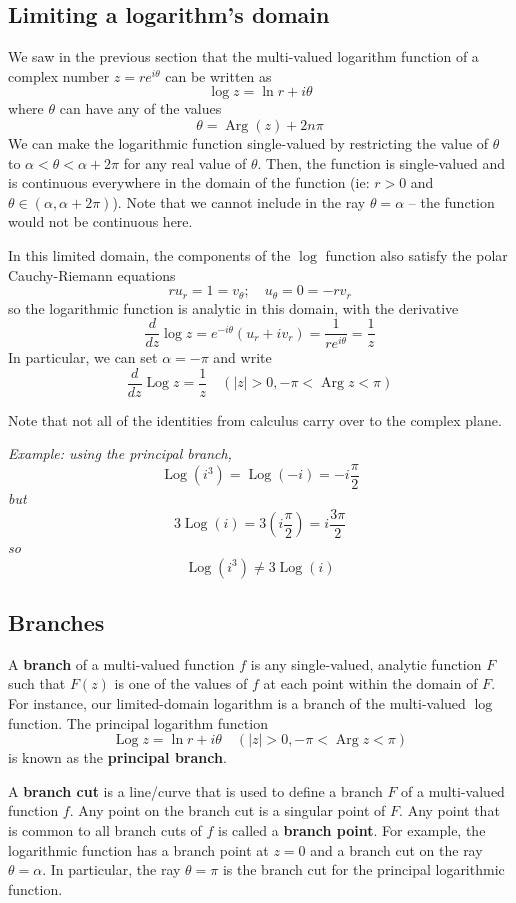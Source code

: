 \documentclass{article}
\renewcommand{\emph}{\textbf}
\DeclareMathOperator{\Log}{Log}
\DeclareMathOperator{\Arg}{Arg}
\begin{document}
\subsection{Limiting a logarithm's domain}
We saw in the previous section that the multi-valued logarithm function of a complex number $z = re^{i\theta}$ can be written as
\[
	\log z = \ln r + i \theta
\]
where $\theta$ can have any of the values
\[
	\theta = \Arg(z) + 2n\pi
\]
We can make the logarithmic function single-valued by restricting the value of $\theta$ to $\alpha < \theta < \alpha + 2\pi$ for any real value of $\theta$. Then, the function is single-valued and is continuous everywhere in the domain of the function (ie: $r > 0$ and $\theta \in (\alpha, \alpha + 2\pi)$). Note that we cannot include in the ray $\theta = \alpha$ -- the function would not be continuous here.

In this limited domain, the components of the $\log$ function also satisfy the polar Cauchy-Riemann equations
\[
	ru_r = 1 = v_\theta;	\quad	u_\theta = 0 = -rv_r
\]
so the logarithmic function is analytic in this domain, with the derivative
\[
	\frac{d}{dz} \log z = e^{-i\theta}(u_r + iv_r) = \frac{1}{re^{i\theta}}
	= \frac{1}{z}
\]
In particular, we can set $\alpha = -\pi$ and write
\[
	\frac{d}{dz} \Log z = \frac{1}{z}	\quad
	(|z| > 0, - \pi < \Arg z < \pi)
\]

Note that not all of the identities from calculus carry over to the complex plane.

\textit{Example: using the principal branch, 
\[
	\Log(i^3) = \Log(-i) = -i \frac{\pi}{2}
\]
but
\[
	3\Log(i) = 3\left(i\frac{\pi}{2}\right) = i\frac{3\pi}{2}
\]
so
\[
	\Log(i^3) \neq 3\Log(i)
\]}

\subsection{Branches}
A \emph{branch} of a multi-valued function $f$ is any single-valued, analytic function $F$ such that $F(z)$ is one of the values of $f$ at each point within the domain of $F$. For instance, our limited-domain logarithm is a branch of the multi-valued $\log$ function. The principal logarithm function
\[
	\Log z = \ln r + i\theta	\quad
	(|z| > 0, -\pi < \Arg z < \pi)
\]
is known as the \emph{principal branch}.

A \emph{branch cut} is a line/curve that is used to define a branch $F$ of a multi-valued function $f$. Any point on the branch cut is a singular point of $F$. Any point that is common to all branch cuts of $f$ is called a \emph{branch point}. For example, the logarithmic function has a branch point at $z = 0$ and a branch cut on the ray $\theta = \alpha$. In particular, the ray $\theta = \pi$ is the branch cut for the principal logarithmic function.
\end{document}
